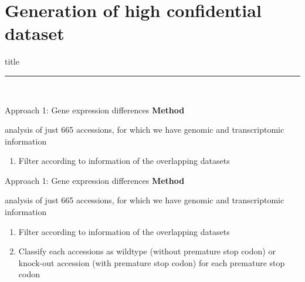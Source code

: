 \documentclass{beamer}
\begin{document}
\section{Generation of high confidential dataset}
\begin{frame}[plain]
    \vfill
    \centering
    \begin{beamercolorbox}[sep=8pt,center,shadow=true,rounded=true]{title}
      \insertsectionhead\par%
      \noindent\rule{10cm}{1pt} \\
    \end{beamercolorbox}
    \vfill
\end{frame}
\begin{frame}{Approach 1: Gene expression differences}
	\textbf{Method}

	analysis of just 665 accessions, for which we have genomic and transcriptomic information
	
	\vspace{5mm}
	\begin{enumerate}
		\item[1.)] Filter according to information of the overlapping datasets
	\end{enumerate}
\end{frame}
\begin{frame}{Approach 1: Gene expression differences}
	\textbf{Method}

	analysis of just 665 accessions, for which we have genomic and transcriptomic information
	
	\vspace{5mm}
	\begin{enumerate}
		\item[1.)] Filter according to information of the overlapping datasets
		\item[2.)] Classify each accessions as wildtype (without premature stop codon) or knock-out accession (with premature stop codon) for each premature stop codon
	\end{enumerate}
\end{frame}
\end{document}
